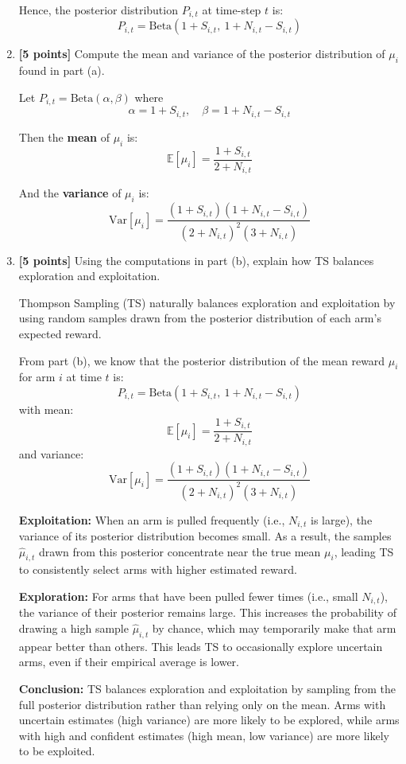 \documentclass[a3paper,12pt]{extarticle} %
\begin{document}
\begin{enumerate}
Hence, the posterior distribution $P_{i,t}$ at time-step $t$ is:
\[
\boxed{
P_{i,t} = \text{Beta}(1 + S_{i,t},\ 1 + N_{i,t} - S_{i,t})
}
\]


    \item \textbf{[5 points]} Compute the mean and variance of the posterior distribution of $\mu_i$ found in part (a).

Let $P_{i,t} = \text{Beta}(\alpha, \beta)$ where
\[
\alpha = 1 + S_{i,t}, \quad \beta = 1 + N_{i,t} - S_{i,t}
\]

Then the \textbf{mean} of $\mu_i$ is:
\[
\mathbb{E}[\mu_i] = \frac{1 + S_{i,t}}{2 + N_{i,t}}
\]

And the \textbf{variance} of $\mu_i$ is:
\[
\text{Var}[\mu_i] = \frac{(1 + S_{i,t})(1 + N_{i,t} - S_{i,t})}{(2 + N_{i,t})^2 (3 + N_{i,t})}
\]


    \item \textbf{[5 points]} Using the computations in part (b), explain how TS balances exploration and exploitation.

Thompson Sampling (TS) naturally balances exploration and exploitation by using random samples drawn from the posterior distribution of each arm's expected reward.

From part (b), we know that the posterior distribution of the mean reward $\mu_i$ for arm $i$ at time $t$ is:
\[
P_{i,t} = \text{Beta}(1 + S_{i,t},\ 1 + N_{i,t} - S_{i,t})
\]
with mean:
\[
\mathbb{E}[\mu_i] = \frac{1 + S_{i,t}}{2 + N_{i,t}}
\]
and variance:
\[
\text{Var}[\mu_i] = \frac{(1 + S_{i,t})(1 + N_{i,t} - S_{i,t})}{(2 + N_{i,t})^2 (3 + N_{i,t})}
\]

\textbf{Exploitation:} When an arm is pulled frequently (i.e., $N_{i,t}$ is large), the variance of its posterior distribution becomes small. As a result, the samples $\hat{\mu}_{i,t}$ drawn from this posterior concentrate near the true mean $\mu_i$, leading TS to consistently select arms with higher estimated reward.

\textbf{Exploration:} For arms that have been pulled fewer times (i.e., small $N_{i,t}$), the variance of their posterior remains large. This increases the probability of drawing a high sample $\hat{\mu}_{i,t}$ by chance, which may temporarily make that arm appear better than others. This leads TS to occasionally explore uncertain arms, even if their empirical average is lower.

\textbf{Conclusion:} TS balances exploration and exploitation by sampling from the full posterior distribution rather than relying only on the mean. Arms with uncertain estimates (high variance) are more likely to be explored, while arms with high and confident estimates (high mean, low variance) are more likely to be exploited.

\end{enumerate}
\end{document}

